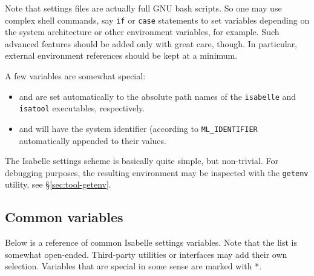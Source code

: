 Note that settings files are actually full GNU bash scripts. So one
may use complex shell commands, say \texttt{if} or \texttt{case}
statements to set variables depending on the system architecture or
other environment variables, for example. Such advanced features
should be added only with great care, though. In particular, external
environment references should be kept at a minimum.

\medskip A few variables are somewhat special:
\begin{itemize}
\item {} and  are set automatically to
  the absolute path names of the \texttt{isabelle} and
  \texttt{isatool} executables, respectively.
  
\item {} and  will have the {\ML}
  system identifier (according to \texttt{ML_IDENTIFIER} automatically
  appended to their values.
\end{itemize}

\medskip The Isabelle settings scheme is basically quite simple, but
non-trivial.  For debugging purposes, the resulting environment may be
inspected with the \texttt{getenv} utility, see
\S\ref{sec:tool-getenv}.


\subsection{Common variables}

Below is a reference of common Isabelle settings variables. Note that
the list is somewhat open-ended. Third-party utilities or interfaces
may add their own selection. Variables that are special in some sense
are marked with *.

